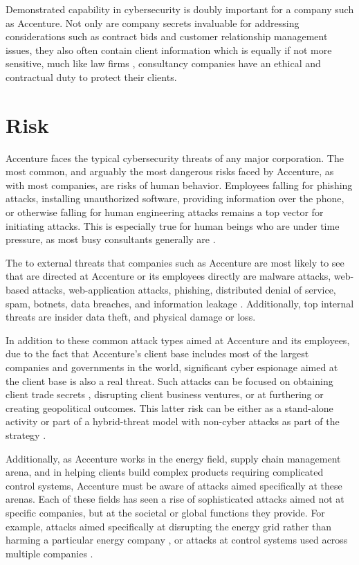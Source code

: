 Demonstrated capability in cybersecurity is doubly important for a company such as Accenture. Not only are company secrets invaluable for addressing considerations such as contract bids and customer relationship management issues, they also often contain client information which is equally if not more sensitive, much like law firms \parencite{riesSafeguardingClientData2018}, consultancy companies have an ethical and contractual duty to protect their clients.

\section{Risk}

Accenture faces the typical cybersecurity threats of any major corporation. The most common, and arguably the most dangerous risks faced by Accenture, as with most companies, are risks of human behavior. Employees falling for phishing attacks, installing unauthorized software, providing information over the phone, or otherwise falling for human engineering attacks remains a top vector for initiating attacks. This is especially true for human beings who are under time pressure, as most busy consultants generally are \parencite{chowdhuryImpactTimePressure2019}.

The to external threats that companies such as Accenture are most likely to see that are directed at Accenture or its employees directly are malware attacks, web-based attacks, web-application attacks, phishing, distributed denial of service, spam, botnets, data breaches, and information leakage \parencite{kettaniTopThreatsCyber2019}. Additionally, top internal threats are insider data theft, and physical damage or loss.

In addition to these common attack types aimed at Accenture and its employees, due to the fact that Accenture's client base includes most of the largest companies and governments in the world, significant cyber espionage aimed at the client base is also a real threat. Such attacks can be focused on obtaining client trade secrets \parencite{levineDtsaOneEmpirical2018}, disrupting client business ventures, or at furthering or creating geopolitical outcomes. This latter risk can be either as a stand-alone activity or part of a hybrid-threat model with non-cyber attacks as part of the strategy \parencite{maresiOffensiveCyberOperations2020}.

Additionally, as Accenture works in the energy field, supply chain management arena, and in helping clients build complex products requiring complicated control systems, Accenture must be aware of attacks aimed specifically at these arenas. Each of these fields has seen a rise of sophisticated attacks aimed not at specific companies, but at the societal or global functions they provide. For example, attacks aimed specifically at disrupting the energy grid rather than harming a particular energy company \parencite{ahmadianCyberAttacksSmart2018}, or attacks at control systems used across multiple companies \parencite{busbyAnalysisAffordanceTime2017}.

